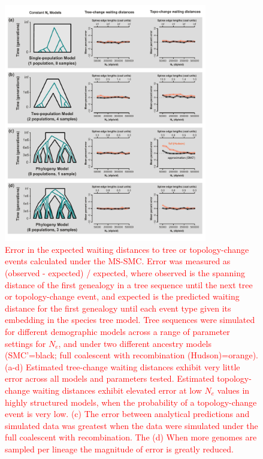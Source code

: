 \documentclass[11pt]{article}
\begin{document}
\begin{figure}[p]
	\centering
	\includegraphics[width=0.79\textwidth]{figures/current/FigSY-smc-approx-bias.pdf}	
	\caption{
		\textcolor{red}{
		Error in the expected waiting distances to tree or topology-change events 
		calculated under the MS-SMC.
		Error was measured as (observed - expected) / expected, where observed is the 
		spanning distance of the first genealogy in a tree sequence until the next 
		tree or topology-change event, and expected is the predicted waiting distance
		for the first genealogy until each event type given its embedding in the 
		species tree model.
		Tree sequences were simulated for different demographic models across a range 
		of parameter settings for $N_e$, and under two different ancestry models
		(SMC'=black; full coalescent with recombination (Hudson)=orange).
		(a-d) Estimated tree-change waiting distances exhibit very little error across
		all models and parameters tested. Estimated topology-change waiting distances
		exhibit elevated error at low $N_e$ values in highly structured models, when
		the probability of a topology-change event is very low.
		(c) The error between analytical predictions and simulated data was greatest 
		when the data were simulated under the full coalescent with recombination. The
		(d) When more genomes are sampled per lineage the magnitude of error is greatly
		reduced.
		}
}
\end{figure}
\end{document}
